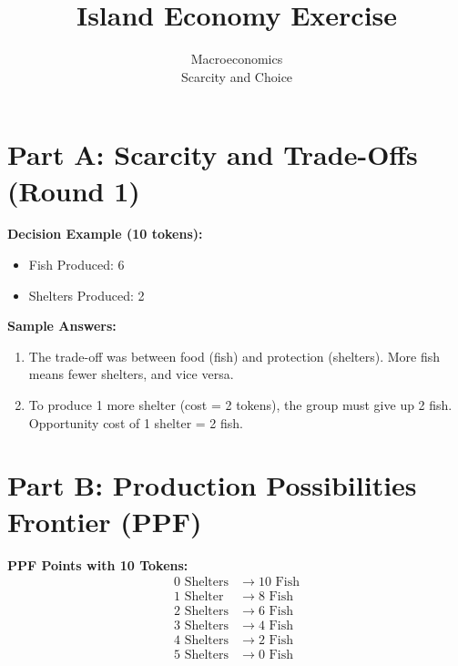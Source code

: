 \documentclass[12pt]{article}
\title{Island Economy Exercise}
\author{Macroeconomics \\ Scarcity and Choice}
\date{}
\begin{document}
\maketitle

\section*{Part A: Scarcity and Trade-Offs (Round 1)}
\textbf{Decision Example (10 tokens):}
\begin{itemize}
    \item Fish Produced: 6
    \item Shelters Produced: 2
\end{itemize}

\noindent \textbf{Sample Answers:}
\begin{enumerate}
    \item The trade-off was between food (fish) and protection (shelters). More fish means fewer shelters, and vice versa.
    \item To produce 1 more shelter (cost = 2 tokens), the group must give up 2 fish. Opportunity cost of 1 shelter = 2 fish.
\end{enumerate}

\section*{Part B: Production Possibilities Frontier (PPF)}
\noindent \textbf{PPF Points with 10 Tokens:}
\[
\begin{aligned}
0 \text{ Shelters} &\to 10 \text{ Fish} \\
1 \text{ Shelter} &\to 8 \text{ Fish} \\
2 \text{ Shelters} &\to 6 \text{ Fish} \\
3 \text{ Shelters} &\to 4 \text{ Fish} \\
4 \text{ Shelters} &\to 2 \text{ Fish} \\
5 \text{ Shelters} &\to 0 \text{ Fish} \\
\end{aligned}
\]

\begin{center}
\end{center}
\end{document}
